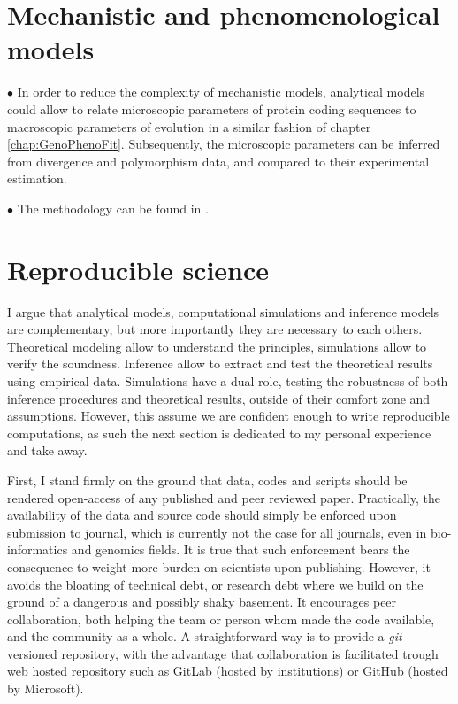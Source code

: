 \section{Mechanistic and phenomenological models}
\label{sec:mechanistic-and-phenomenological-models}

$\bullet$ In order to reduce the complexity of mechanistic models, analytical models could allow to relate microscopic parameters of protein coding sequences to macroscopic parameters of evolution in a similar fashion of chapter \ref{chap:GenoPhenoFit}.
Subsequently, the microscopic parameters can be inferred from divergence and polymorphism data, and compared to their experimental estimation.

$\bullet$ The methodology can be found in \citet{Brevet2019}.

\section{Reproducible science}
\label{sec:reproducible-science}

I argue that analytical models, computational simulations and inference models are complementary, but more importantly they are necessary to each others.
Theoretical modeling allow to understand the principles, simulations allow to verify the soundness.
Inference allow to extract and test the theoretical results using empirical data.
Simulations have a dual role, testing the robustness of both inference procedures and theoretical results, outside of their comfort zone and assumptions.
However, this assume we are confident enough to write reproducible computations, as such the next section is dedicated to my personal experience and take away.

First, I stand firmly on the ground that data, codes and scripts should be rendered open-access of any published and peer reviewed paper.
Practically, the availability of the data and source code should simply be enforced upon submission to journal, which is currently not the case for all journals, even in bio-informatics and genomics fields.
It is true that such enforcement bears the consequence to weight more burden on scientists upon publishing.
However, it avoids the bloating of technical debt, or research debt where we build on the ground of a dangerous and possibly shaky basement.
It encourages peer collaboration, both helping the team or person whom made the code available, and the community as a whole.
A straightforward way is to provide a \textit{git} versioned repository, with the advantage that collaboration is facilitated trough web hosted repository such as GitLab (hosted by institutions) or GitHub (hosted by Microsoft).

